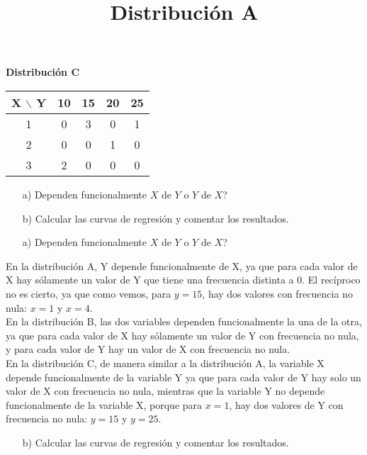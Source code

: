 \documentclass[a4paper,12pt]{article}
\begin{document}
\textbf{Distribución C}
\begin{center}
\begin{tabular}{c|cccc}
X $\backslash$ Y & 10 & 15 & 20 & 25 \\
\hline
1 & 0 & 3 & 0 & 1 \\
2 & 0 & 0 & 1 & 0 \\
3 & 2 & 0 & 0 & 0 \\
\end{tabular}
\end{center}

\begin{enumerate}
    \item[a)] \textquestiondown Dependen funcionalmente $X$ de $Y$ o $Y$ de $X$?
    \item[b)] Calcular las curvas de regresión y comentar los resultados.
\end{enumerate}

\begin{enumerate}
    \item[a)] \textquestiondown Dependen funcionalmente $X$ de $Y$ o $Y$ de $X$?
\end{enumerate}

En la distribución A, Y depende funcionalmente de X, ya que para cada valor de X hay sólamente un valor de Y que tiene una frecuencia distinta a 0. El recíproco no es cierto, ya que como vemos, para $y=15$, hay dos valores con frecuencia no nula: $x=1$ y $x=4$.\\

En la distribución B, las dos variables dependen funcionalmente la una de la otra, ya que para cada valor de X hay sólamente un valor de Y con frecuencia no nula, y para cada valor de Y hay un valor de X con frecuencia no nula.\\

En la distribución C, de manera similar a la distribución A, la variable X depende funcionalmente de la variable Y ya que para cada valor de Y hay solo un valor de X con frecuencia no nula, mientras que la variable Y no depende funcionalmente de la variable X, porque para $x=1$, hay dos valores de Y con frecuencia no nula: $y=15$ y $y=25$.\\

\begin{enumerate}
    \item[b)] Calcular las curvas de regresión y comentar los resultados.
\end{enumerate}

\title{Distribución A}\\
\end{document}
